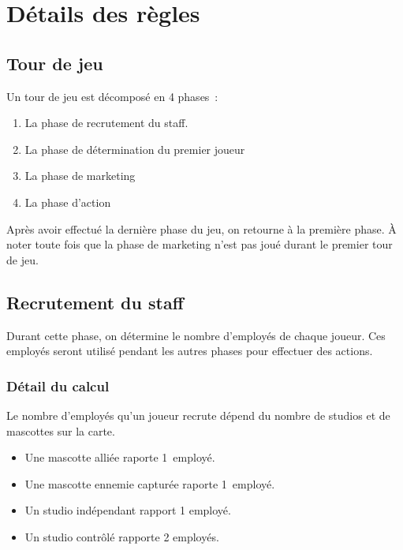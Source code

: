 \chapter{Détails des règles} \label{chapter:detail-regles}

        \section{Tour de jeu}

            Un tour de jeu est décomposé en 4 phases :

            \begin{enumerate}
                \item La phase de recrutement du staff.
                \item La phase de détermination du premier joueur
                \item La phase de marketing
                \item La phase d'action
            \end{enumerate}

            Après avoir effectué la dernière phase du jeu, on retourne à la première phase.
            À noter toute fois que la phase de marketing n'est pas joué durant le premier tour de jeu.

        \section{Recrutement du staff}
            Durant cette phase, on détermine le nombre d'employés de chaque joueur. Ces employés seront utilisé
            pendant les autres phases pour effectuer des actions.

            \subsection{Détail du calcul}
                Le nombre d'employés qu'un joueur recrute dépend du nombre de studios et de mascottes sur la carte.
                \begin{itemize}
                    \item Une mascotte alliée raporte 1 employé.
                    \item Une mascotte ennemie capturée raporte 1 employé.
                    \item Un studio indépendant rapport 1 employé.
                    \item Un studio contrôlé rapporte 2 employés.
                \end{itemize}

